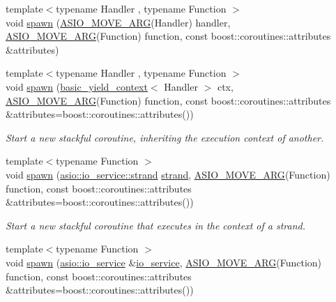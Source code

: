 \begin{DoxyCompactItemize}
\item 
{\footnotesize template$<$typename Handler , typename Function $>$ }\\void \hyperlink{group__spawn_ga4f2228347a699338928b72b60b52e345}{spawn} (\hyperlink{group__async__read_ga6d72a97784dde9476c6d93b8904a4967}{A\+S\+I\+O\+\_\+\+M\+O\+V\+E\+\_\+\+A\+R\+G}(Handler) handler, \hyperlink{group__async__read_ga6d72a97784dde9476c6d93b8904a4967}{A\+S\+I\+O\+\_\+\+M\+O\+V\+E\+\_\+\+A\+R\+G}(Function) function, const boost\+::coroutines\+::attributes \&attributes)
\item 
{\footnotesize template$<$typename Handler , typename Function $>$ }\\void \hyperlink{group__spawn_ga96a673b1867f7983c6701bb0dc658c36}{spawn} (\hyperlink{classasio_1_1basic__yield__context}{basic\+\_\+yield\+\_\+context}$<$ Handler $>$ ctx, \hyperlink{group__async__read_ga6d72a97784dde9476c6d93b8904a4967}{A\+S\+I\+O\+\_\+\+M\+O\+V\+E\+\_\+\+A\+R\+G}(Function) function, const boost\+::coroutines\+::attributes \&attributes=boost\+::coroutines\+::attributes())
\begin{DoxyCompactList}\small\item\em Start a new stackful coroutine, inheriting the execution context of another. \end{DoxyCompactList}\item 
{\footnotesize template$<$typename Function $>$ }\\void \hyperlink{group__spawn_ga832418b551fda9707d57eadcbb40142c}{spawn} (\hyperlink{classasio_1_1io__service_1_1strand}{asio\+::io\+\_\+service\+::strand} \hyperlink{namespaceasio_a3be3fa00c86ab58ba41aabe8fcbf11be}{strand}, \hyperlink{group__async__read_ga6d72a97784dde9476c6d93b8904a4967}{A\+S\+I\+O\+\_\+\+M\+O\+V\+E\+\_\+\+A\+R\+G}(Function) function, const boost\+::coroutines\+::attributes \&attributes=boost\+::coroutines\+::attributes())
\begin{DoxyCompactList}\small\item\em Start a new stackful coroutine that executes in the context of a strand. \end{DoxyCompactList}\item 
{\footnotesize template$<$typename Function $>$ }\\void \hyperlink{group__spawn_gab669a6a11388d45fb48bc9be9e5bda38}{spawn} (\hyperlink{classasio_1_1io__service}{asio\+::io\+\_\+service} \&\hyperlink{classasio_1_1io__service}{io\+\_\+service}, \hyperlink{group__async__read_ga6d72a97784dde9476c6d93b8904a4967}{A\+S\+I\+O\+\_\+\+M\+O\+V\+E\+\_\+\+A\+R\+G}(Function) function, const boost\+::coroutines\+::attributes \&attributes=boost\+::coroutines\+::attributes())

\end{DoxyCompactItemize}
